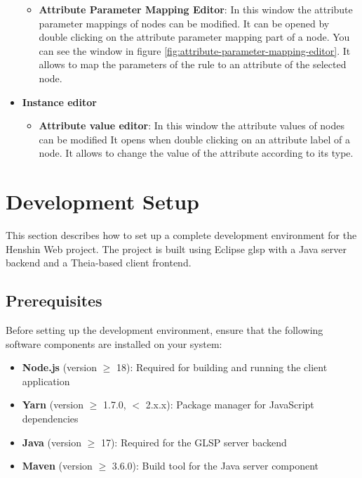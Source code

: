 \begin{itemize}
\begin{itemize}
        \item \textbf{Attribute Parameter Mapping Editor}: In this window the attribute parameter mappings of nodes can be modified. It can be opened by double clicking on the attribute parameter mapping part of a node. You can see the window in figure \ref{fig:attribute-parameter-mapping-editor}. It allows to map the parameters of the rule to an attribute of the selected node.
    \end{itemize}
    \item \textbf{Instance editor}
    \begin{itemize}
        \item \textbf{Attribute value editor}: In this window the attribute values of nodes can be modified It opens when double clicking on an attribute label of a node. It allows to change the value of the attribute according to its type.
    \end{itemize}
\end{itemize}


\section{Development Setup}
\label{sec:dev_setup}

This section describes how to set up a complete development environment for the Henshin Web project. The project is built using Eclipse \ac{glsp} with a Java server backend and a Theia-based client frontend.

\subsection{Prerequisites}
\label{subsec:prerequisites}

Before setting up the development environment, ensure that the following software components are installed on your system:

\begin{itemize}
    \item \textbf{Node.js} (version $\geq$ 18): Required for building and running the client application
    \item \textbf{Yarn} (version $\geq$ 1.7.0, $<$ 2.x.x): Package manager for JavaScript dependencies
    \item \textbf{Java} (version $\geq$ 17): Required for the GLSP server backend
    \item \textbf{Maven} (version $\geq$ 3.6.0): Build tool for the Java server component
\end{itemize}

